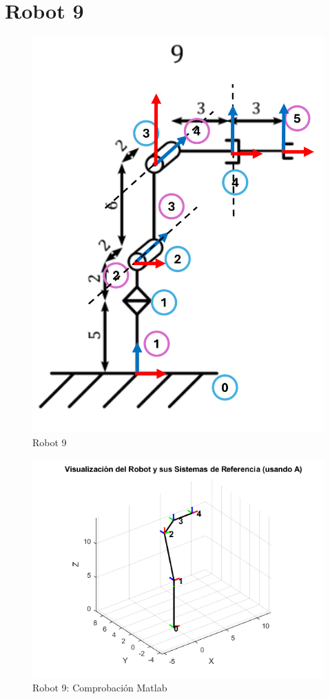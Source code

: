 \section{Robot 9}
\begin{figure}[h]
	\centering
	{%
		\includegraphics[width=0.5\linewidth]{img/Robot9_1}
		\caption{Robot 9}
		\label{fig:robot91}
	}
\end{figure}
\begin{figure}[h]
	\centering
	{%
		\includegraphics[width=0.7\linewidth]{img/Robot9}
		\caption{Robot 9: Comprobación Matlab}
		\label{fig:robot9}
	}
\end{figure}